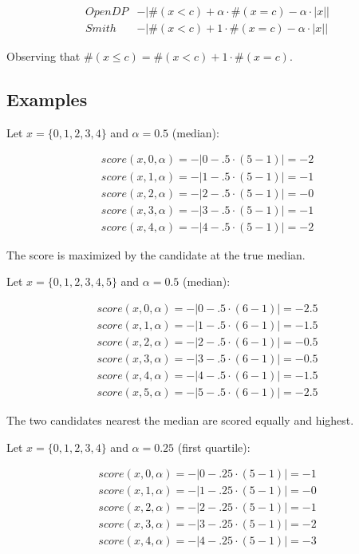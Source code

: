 \documentclass{article}
\begin{document}
\[ 
\begin{array}{cl} 
    OpenDP &-|\#(x < c) + \alpha \cdot \#(x = c) - \alpha \cdot |x|| \\ 
    Smith &-|\#(x < c) + 1 \cdot \#(x = c) - \alpha \cdot |x|| 
\end{array} 
\] 
 
Observing that $\#(x \leq c) = \#(x < c) + 1 \cdot \#(x = c)$. 
 
 
\subsection{Examples} 
 
Let $x = \{0,1,2,3,4\}$ and $\alpha = 0.5$ (median): 
 
\begin{align*} 
    score(x, 0, \alpha) = -|0 - .5 \cdot (5 - 1)| = -2 \\ 
    score(x, 1, \alpha) = -|1 - .5 \cdot (5 - 1)| = -1 \\ 
    score(x, 2, \alpha) = -|2 - .5 \cdot (5 - 1)| = -0 \\ 
    score(x, 3, \alpha) = -|3 - .5 \cdot (5 - 1)| = -1 \\ 
    score(x, 4, \alpha) = -|4 - .5 \cdot (5 - 1)| = -2 
\end{align*} 
 
The score is maximized by the candidate at the true median. 
 
Let $x = \{0,1,2,3,4,5\}$ and $\alpha = 0.5$ (median): 
 
\begin{align*} 
    score(x, 0, \alpha) = -|0 - .5 \cdot (6 - 1)| = -2.5 \\ 
    score(x, 1, \alpha) = -|1 - .5 \cdot (6 - 1)| = -1.5 \\ 
    score(x, 2, \alpha) = -|2 - .5 \cdot (6 - 1)| = -0.5 \\ 
    score(x, 3, \alpha) = -|3 - .5 \cdot (6 - 1)| = -0.5 \\ 
    score(x, 4, \alpha) = -|4 - .5 \cdot (6 - 1)| = -1.5 \\ 
    score(x, 5, \alpha) = -|5 - .5 \cdot (6 - 1)| = -2.5 
\end{align*} 
 
The two candidates nearest the median are scored equally and highest. 
 
Let $x = \{0,1,2,3,4\}$ and $\alpha = 0.25$ (first quartile): 
 
\begin{align*} 
    score(x, 0, \alpha) = -|0 - .25 \cdot (5 - 1)| = -1 \\ 
    score(x, 1, \alpha) = -|1 - .25 \cdot (5 - 1)| = -0 \\ 
    score(x, 2, \alpha) = -|2 - .25 \cdot (5 - 1)| = -1 \\ 
    score(x, 3, \alpha) = -|3 - .25 \cdot (5 - 1)| = -2 \\ 
    score(x, 4, \alpha) = -|4 - .25 \cdot (5 - 1)| = -3 
\end{align*} 
 
\end{document}

